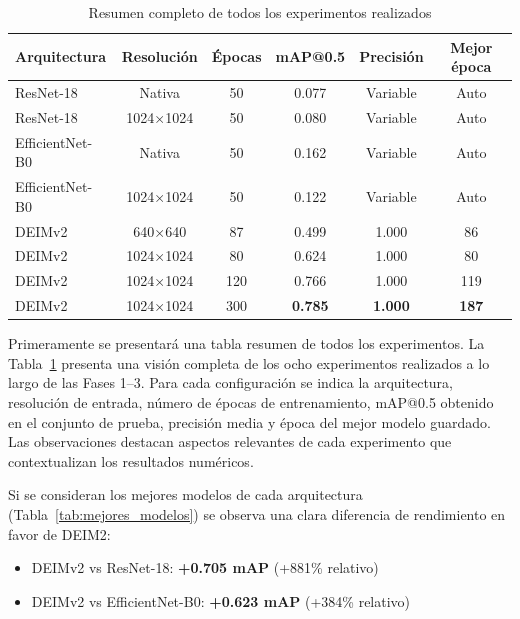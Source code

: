 \begin{table}[htbp]
\centering
\small
\begin{tabular}{lccccc}
\toprule
\textbf{Arquitectura} & \textbf{Resolución} & \textbf{Épocas} & \textbf{mAP@0.5} & \textbf{Precisión} & \textbf{Mejor época} \\
\midrule
ResNet-18 & Nativa & 50 & 0.077 & Variable & Auto \\
ResNet-18 & 1024×1024 & 50 & 0.080 & Variable & Auto \\
\midrule
EfficientNet-B0 & Nativa & 50 & 0.162 & Variable & Auto \\
EfficientNet-B0 & 1024×1024 & 50 & 0.122 & Variable & Auto \\
\midrule
DEIMv2 & 640×640 & 87 & 0.499 & 1.000 & 86 \\
DEIMv2 & 1024×1024 & 80 & 0.624 & 1.000 & 80 \\
DEIMv2 & 1024×1024 & 120 & 0.766 & 1.000 & 119 \\
DEIMv2 & 1024×1024 & 300 & \textbf{0.785} & \textbf{1.000} & \textbf{187} \\
\bottomrule
\end{tabular}
\caption{Resumen completo de todos los experimentos realizados}
\label{tab:resumen_experimentos}
\end{table}

Primeramente se presentará una tabla resumen de todos los experimentos. La Tabla~\ref{tab:resumen_experimentos} presenta una visión completa de los ocho experimentos realizados a lo largo de las Fases 1--3. Para cada configuración se indica la arquitectura, resolución de entrada, número de épocas de entrenamiento, mAP@0.5 obtenido en el conjunto de prueba, precisión media y época del mejor modelo guardado. Las observaciones destacan aspectos relevantes de cada experimento que contextualizan los resultados numéricos.

Si se consideran los mejores modelos de cada arquitectura (Tabla~\ref{tab:mejores_modelos}) se observa una clara diferencia de rendimiento en favor de DEIM2:
\begin{itemize}
    \item DEIMv2 vs ResNet-18: \textbf{+0.705 mAP} (+881\% relativo)
    \item DEIMv2 vs EfficientNet-B0: \textbf{+0.623 mAP} (+384\% relativo)
\end{itemize}

